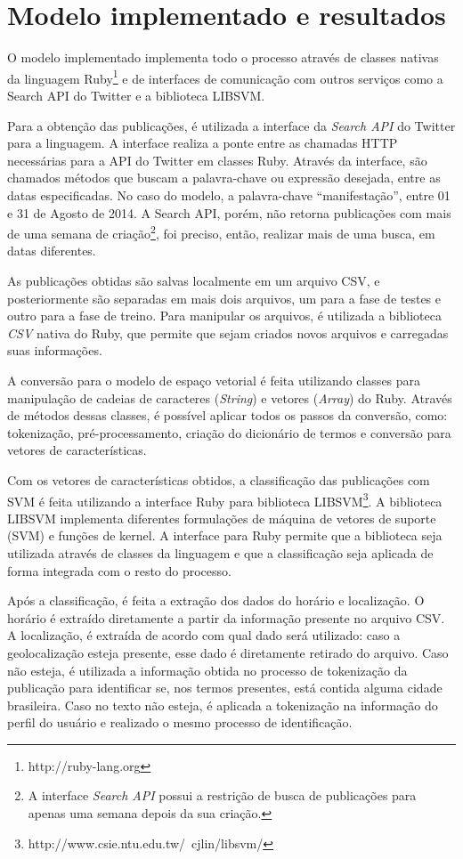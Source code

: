 \chapter{Modelo implementado e resultados}

O modelo implementado implementa todo o processo através de classes nativas da linguagem Ruby\footnote{http://ruby-lang.org} e de interfaces de comunicação com outros serviços como a Search API do Twitter e a biblioteca LIBSVM.

Para a obtenção das publicações, é utilizada a interface da \textit{Search API} do Twitter para a linguagem. A interface realiza a ponte entre as chamadas HTTP necessárias para a API do Twitter em classes Ruby. Através da interface, são chamados métodos que buscam a palavra-chave ou expressão desejada, entre as datas especificadas. No caso do modelo, a palavra-chave ``manifestação'', entre 01 e 31 de Agosto de 2014. A Search API, porém, não retorna publicações com mais de uma semana de criação\footnote{A interface \textit{Search API} possui a restrição de busca de publicações para apenas uma semana depois da sua criação.}, foi preciso, então, realizar mais de uma busca, em datas diferentes. 

As publicações obtidas são salvas localmente em um arquivo CSV, e posteriormente são separadas em mais dois arquivos, um para a fase de testes e outro para a fase de treino. Para manipular os arquivos, é utilizada a biblioteca \textit{CSV} nativa do Ruby, que permite que sejam criados novos arquivos e carregadas suas informações.

A conversão para o modelo de espaço vetorial é feita utilizando classes para manipulação de cadeias de caracteres (\textit{String}) e vetores (\textit{Array}) do Ruby. Através de métodos dessas classes, é possível aplicar todos os passos da conversão, como: tokenização, pré-processamento, criação do dicionário de termos e conversão para vetores de características.

Com os vetores de características obtidos, a classificação das publicações com SVM é feita utilizando a interface Ruby para biblioteca LIBSVM\footnote{http://www.csie.ntu.edu.tw/~cjlin/libsvm/}. A biblioteca LIBSVM implementa diferentes formulações de máquina de vetores de suporte (SVM) e funções de kernel. A interface para Ruby permite que a biblioteca seja utilizada através de classes da linguagem e que a classificação seja aplicada de forma integrada com o resto do processo.

Após a classificação, é feita a extração dos dados do horário e localização. O horário é extraído diretamente a partir da informação presente no arquivo CSV. A localização, é extraída de acordo com qual dado será utilizado: caso a geolocalização esteja presente, esse dado é diretamente retirado do arquivo. Caso não esteja, é utilizada a informação obtida no processo de tokenização da publicação para identificar se, nos termos presentes, está contida alguma cidade brasileira. Caso no texto não esteja, é aplicada a tokenização na informação do perfil do usuário e realizado o mesmo processo de identificação.

